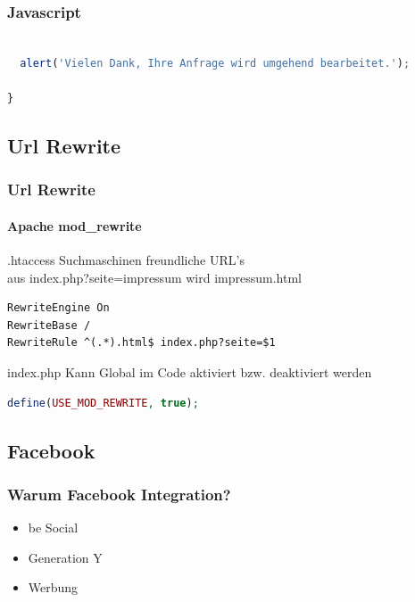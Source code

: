 \documentclass[xcolor=dvipsnames]{beamer}
\begin{document}
\begin{frame}[fragile]
\frametitle{Javascript}

\begin{lstlisting}[language=javascript, firstnumber=56]
	
  alert('Vielen Dank, Ihre Anfrage wird umgehend bearbeitet.');

}

\end{lstlisting}
\end{frame}



\subsection{Url Rewrite}
\begin{frame}[fragile]
  \frametitle{Url Rewrite}
  \framesubtitle{Apache mod\_rewrite} %

 \begin{block}{.htaccess}
	Suchmaschinen freundliche URL's \\
	aus index.php?seite=impressum wird impressum.html
  \end{block}

\begin{lstlisting}[language=HTML]
RewriteEngine On
RewriteBase /
RewriteRule ^(.*).html$ index.php?seite=$1
\end{lstlisting}

  \begin{block}{index.php}
	Kann Global im Code aktiviert bzw. deaktiviert werden
  \end{block}

\begin{lstlisting}[language=PHP, firstnumber=4]
define(USE_MOD_REWRITE, true);

\end{lstlisting}
\end{frame}

\subsection{Facebook}
\begin{frame} %
  \frametitle{Warum Facebook Integration?} %
  \begin{block}{}
	\begin{itemize}
		\item be Social
		\item Generation Y
		\item Werbung
	\end{itemize}
  \end{block}
\end{frame}
\end{document}
